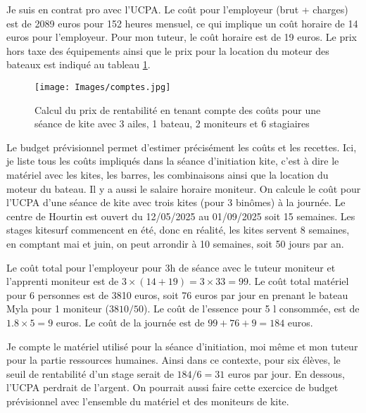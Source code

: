 \documentclass[11pt,a4paper]{report}
\begin{document}
Je suis en contrat pro avec l'UCPA. Le coût pour
l'employeur (brut + charges) est de 2089 euros pour 152 heures mensuel, 
ce qui implique un coût horaire de 14 euros pour l'employeur.
Pour mon tuteur, le coût horaire est de 19 euros. Le prix hors taxe
des équipements ainsi que le prix pour la location du moteur des
bateaux est indiqué au tableau \ref{couts}.

\begin{figure}
\texttt{[image: Images/comptes.jpg]} 
\caption{Calcul du prix de rentabilité en tenant compte
des co\^uts  pour une séance de kite
avec 3 ailes, 1 bateau, 2 moniteurs et 6 stagiaires\label{couts}}
\end{figure}

Le budget prévisionnel permet d'estimer précisément les co\^uts et les recettes.
Ici, je liste tous les coûts impliqués dans la séance d’initiation kite, 
c'est  à dire le matériel avec les kites, les barres, les 
combinaisons ainsi que la location du moteur du bateau. 
Il y a aussi le salaire horaire moniteur. On calcule le coût pour l'UCPA
d'une séance de kite avec trois kites (pour 3 binômes) à la journée.
Le centre de Hourtin est ouvert du 12/05/2025 au 01/09/2025 soit 15 semaines. 
Les stages kitesurf commencent en été, donc en réalité, les kites servent
8 semaines, en comptant mai et juin, on peut arrondir à 10 semaines,
soit 50 jours par an.

Le coût total pour l'employeur pour 3h de séance avec le tuteur moniteur
et l'apprenti moniteur est de $3\times(14+19) = 3\times33 = 99 $.
Le coût total matériel pour 6 personnes est de 3810 euros, soit 76 euros
par jour  en prenant le bateau Myla pour 1 moniteur ($3810/50$).
Le coût de l'essence pour 5 l consommée, est de $1.8\times5 = 9$ euros.
Le coût de la journée est de $99 + 76 + 9 =  184 $ euros.

Je compte le matériel utilisé pour la séance d’initiation,
moi m\^eme et mon tuteur pour la partie ressources humaines.
Ainsi dans ce contexte,  pour six élèves, le seuil de rentabilité
d'un stage serait de $184/6 = 31$ euros
par jour. En dessous, l'UCPA perdrait de l'argent.
On pourrait aussi faire cette exercice de budget prévisionnel avec
l'ensemble du matériel et des moniteurs de kite.
\end{document}
